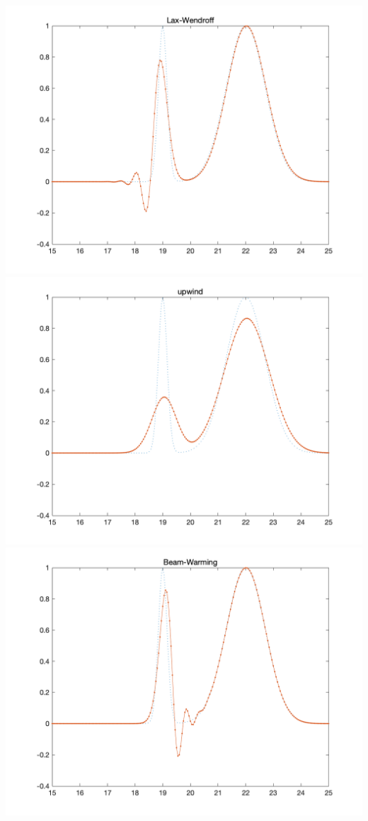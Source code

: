 \documentclass{article}
\begin{document}
\includegraphics[scale = 0.175]{Lax_Wendroff.png}\\
\includegraphics[scale = 0.175]{upwind.png}
\includegraphics[scale = 0.175]{Beam_Warming.png}\\
\end{document}
